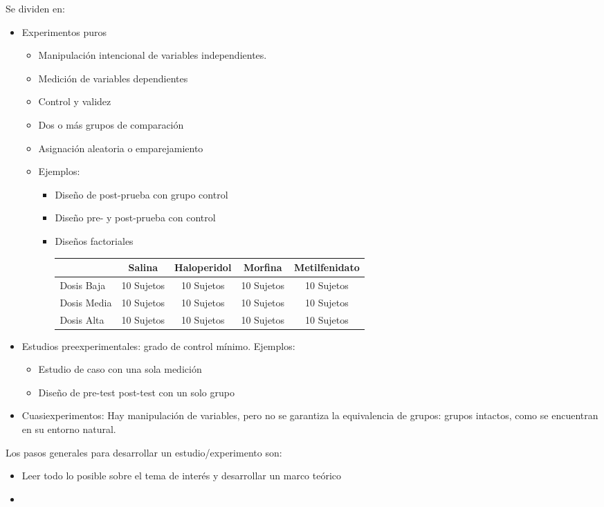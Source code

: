 \documentclass[a4paper,12pt]{article}
\begin{document}
\begin{itemize}
        Se dividen en:
        \begin{itemize}
            \item Experimentos puros
                \begin{itemize}
                    \item Manipulación intencional de variables independientes.
                    \item Medición de variables dependientes
                    \item Control y validez
                    \item Dos o más grupos de comparación
                    \item Asignación aleatoria o emparejamiento
                    \item Ejemplos:
                        \begin{itemize}
                            \item Diseño de post-prueba con grupo control
                            \item Diseño pre- y post-prueba con control
                            \item Diseños factoriales
                                \\[2mm]
                                \begin{tabular}{l|c|c|c|c}
                                                & Salina     & Haloperidol & Morfina        & Metilfenidato\\
                                    \hline
                                    Dosis Baja  & 10 Sujetos & 10 Sujetos  & 10 Sujetos     & 10 Sujetos\\
                                    \hline
                                    Dosis Media & 10 Sujetos & 10 Sujetos  & 10 Sujetos     & 10 Sujetos\\
                                    \hline
                                    Dosis Alta  & 10 Sujetos & 10 Sujetos  & 10 Sujetos     & 10 Sujetos\\
                                \end{tabular}

                        \end{itemize}
                \end{itemize}
            \item Estudios preexperimentales: grado de control mínimo. Ejemplos:
                \begin{itemize}
                    \item Estudio de caso con una sola medición
                    \item Diseño de pre-test post-test con un solo grupo
                \end{itemize}
            \item Cuasiexperimentos: Hay manipulación de variables, pero no se garantiza la equivalencia de grupos: grupos intactos, como se encuentran en su entorno natural.
        \end{itemize}
\end{itemize}

Los pasos generales para desarrollar un estudio/experimento son:

\begin{itemize}
    \item Leer todo lo posible sobre el tema de interés y desarrollar un marco teórico
    \item 
\end{itemize}
\end{document}
